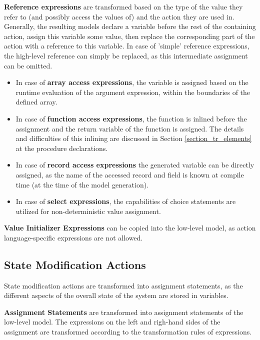 \bigskip
\textbf{Reference expressions} are transformed based on the type of the value they refer to (and possibly access the values of) and the action they are used in. Generally, the resulting models declare a variable before the rest of the containing action, assign this variable some value, then replace the corresponding part of the action with a reference to this variable. In case of 'simple' reference expressions, the high-level reference can simply be replaced, as this intermediate assignment can be omitted.
\begin{itemize}
	\item In case of \textbf{array access expressions}, the variable is assigned based on the runtime evaluation of the argument expression, within the boundaries of the defined array.
	\item In case of \textbf{function access expressions}, the function is inlined before the assignment and the return variable of the function is assigned. The details and difficulties of this inlining are discussed in Section \ref{section_tr_elements} at the procedure declarations.
	\item In case of \textbf{record access expressions} the generated variable can be directly assigned, as the name of the accessed record and field is known at compile time (at the time of the model generation).
	\item In case of \textbf{select expressions}, the capabilities of choice statements are utilized for non-deterministic value assignment.
\end{itemize}

\bigskip
\textbf{Value Initializer Expressions} can be copied into the low-level model, as action language-specific expressions are not allowed.

\subsection{State Modification Actions}
State modification actions are transformed into assignment statements, as the different aspects of the overall state of the system are stored in variables.

\bigskip
\textbf{Assignment Statements} are transformed into assignment statements of the low-level model. The expressions on the left and righ-hand sides of the assignment are transformed according to the transformation rules of expressions.


